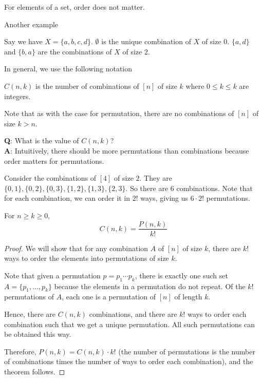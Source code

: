 \begin{remark}
   For elements of a set, order does not matter.
\end{remark}

Another example
\begin{example}
   Say we have $X=\{a,b,c,d\}$. $\emptyset$ is the unique combination of $X$ of size $0$. $\{a,d\}$ and $\{b,a\}$ are the combinations of $X$ of size 2.
\end{example}

In general, we use the following notation
\begin{definition}
   $C(n,k)$ is the number of combinations of $[n]$ of size $k$ where $0 \leq k \leq k$ are integers.
\end{definition}

\begin{remark}
   Note that as with the case for permutation, there are no combinations of $[n]$ of size $k > n$.
\end{remark}

\textbf{Q}: What is the value of $C(n,k)$? \\
\textbf{A}: Intuitively, there should be more permutations than combinations because order matters for permutations.

Consider the combinations of $[4]$ of size $2$. They are $\{0,1\}, \{0,2\}, \{0,3\}, \{1,2\}, \{1,3\}, \{2,3\}$. So there are 6 combinations. Note that for each combination, we can order it in $2!$ ways, giving us $6 \cdot 2!$ permutations.

\begin{theorem}
   For $n \geq k \geq 0$,
   $$
   C(n,k) = \frac{P(n,k)}{k!}
   $$
\end{theorem}

\begin{proof}
   We will show that for any combination $A$ of $[n]$ of size $k$, there are $k!$ ways to order the elements into permutations of size $k$.

   Note that given a permutation $p = p_1\cdots p_k$, there is exactly one such set $A = \{p_1,\ldots,p_k\}$ because the elements in a permutation do not repeat. Of the $k!$ permutations of $A$, each one is a permutation of $[n]$ of length $k$.

   Hence, there are $C(n,k)$ combinations, and there are $k!$ ways to order each combination such that we get a unique permutation. All such permutations can be obtained this way.

   Therefore, $P(n,k) = C(n,k) \cdot k!$ (the number of permutations is the number of combinations times the number of ways to order each combination), and the theorem follows.
\end{proof}


